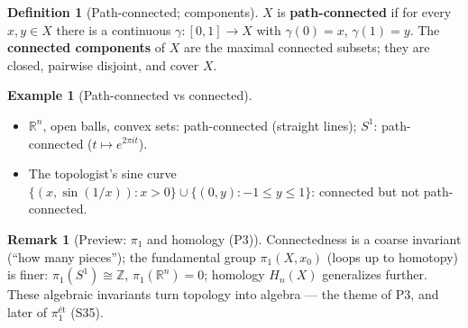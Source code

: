 \documentclass[11pt,a4paper]{article}
\theoremstyle{definition}
\newtheorem{definition}[theorem]{Definition}
\newtheorem{example}[theorem]{Example}
\newtheorem{remark}[theorem]{Remark}
\newcommand{\R}{\mathbb{R}}
\newcommand{\Z}{\mathbb{Z}}
\begin{document}
	\begin{definition}[Path-connected; components]
		$X$ is \textbf{path-connected} if for every $x,y\in X$ there is a continuous $\gamma:[0,1]\to X$ with
		$\gamma(0)=x$, $\gamma(1)=y$. The \textbf{connected components} of $X$ are the maximal connected subsets;
		they are closed, pairwise disjoint, and cover $X$.
	\end{definition}
	
	\begin{example}[Path-connected vs connected]\label{ex:path}
		\begin{itemize}
			\item $\R^n$, open balls, convex sets: path-connected (straight lines); $S^1$: path-connected ($t\mapsto e^{2\pi it}$).
			\item The topologist's sine curve $\{(x,\sin(1/x)):x>0\}\cup\{(0,y):-1\le y\le1\}$: connected but not path-connected.
		\end{itemize}
	\end{example}
	
	\begin{remark}[Preview: $\pi_1$ and homology (P3)]\label{rem:pi1}
		Connectedness is a coarse invariant (``how many pieces''); the fundamental group $\pi_1(X,x_0)$ (loops up
		to homotopy) is finer: $\pi_1(S^1)\cong\Z$, $\pi_1(\R^n)=0$; homology $H_n(X)$ generalizes further. These
		algebraic invariants turn topology into algebra --- the theme of P3, and later of $\pi_1^{\text{\'et}}$ (S35).
	\end{remark}
	
\end{document}
